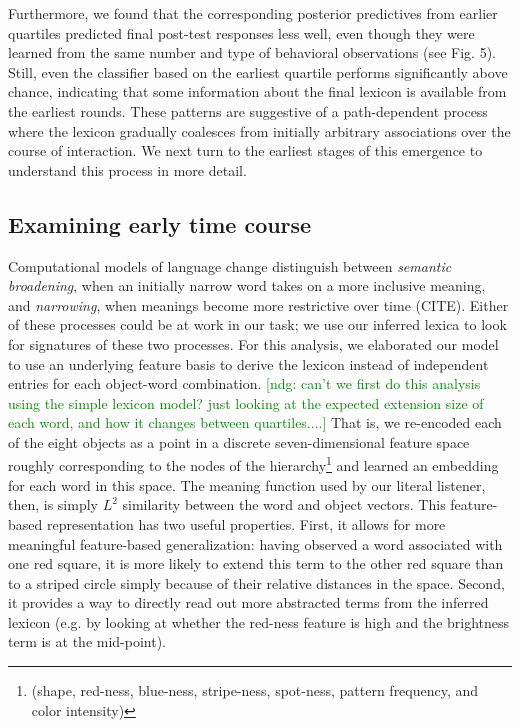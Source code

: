 \documentclass[10pt,letterpaper]{article}
\newcommand{\ndg}[1]{\textcolor{Green}{[ndg: #1]}}
\begin{document}
Furthermore, we found that the corresponding posterior predictives from earlier quartiles predicted final post-test responses less well, even though they were learned from the same number and type of behavioral observations (see Fig. 5). Still, even the classifier based on the earliest quartile performs significantly above chance, indicating that some information about the final lexicon is available from the earliest rounds. These patterns are suggestive of a path-dependent process where the lexicon gradually coalesces from initially arbitrary associations over the course of interaction. We next turn to the earliest stages of this emergence to understand this process in more detail.

\subsection{Examining early time course}

Computational models of language change distinguish between \emph{semantic broadening}, when an initially narrow word takes on a more inclusive meaning, and \emph{narrowing}, when meanings become more restrictive over time (CITE). Either of these processes could be at work in our task; we use our inferred lexica to look for signatures of these two processes. %
For this analysis, we elaborated our model to use an underlying feature basis to derive the lexicon instead of independent entries for each object-word combination. 
\ndg{can't we first do this analysis using the simple lexicon model? just looking at the expected extension size of each word, and how it changes between quartiles....}
That is, we re-encoded each of the eight objects as a point in a discrete seven-dimensional feature space roughly corresponding to the nodes of the hierarchy\footnote{(shape, red-ness, blue-ness, stripe-ness, spot-ness, pattern frequency, and color intensity)} and learned an embedding for each word in this space. The meaning function used by our literal listener, then, is simply $L^2$ similarity between the word and object vectors. This feature-based representation has two useful properties. First, it allows for more meaningful feature-based generalization: having observed a word associated with one red square, it is more likely to extend this term to the other red square than to a striped circle simply because of their relative distances in the space. Second, it provides a way to directly read out more abstracted terms from the inferred lexicon (e.g. by looking at whether the red-ness feature is high and the brightness term is at the mid-point). 
\end{document}
